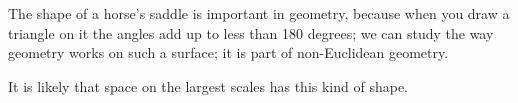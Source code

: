 The shape of a horse's saddle is important 
in geometry, because when you draw a triangle
on it the angles add up to less than 180 degrees;
we can study the way geometry works on such a 
surface; it is part of non-Euclidean geometry.
\par
It is likely that space on the largest scales
has this kind of shape.